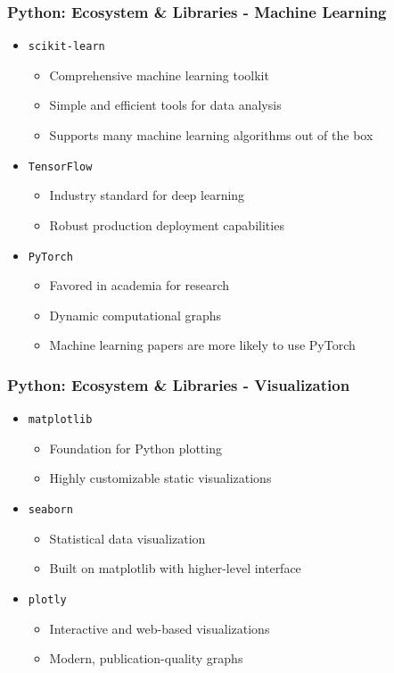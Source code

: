 \documentclass[10pt]{beamer}
\begin{document}
\begin{frame}
    \frametitle{Python: Ecosystem \& Libraries - Machine Learning}
    \begin{itemize}
        \item \texttt{scikit-learn}
            \begin{itemize}
                \item Comprehensive machine learning toolkit
                \item Simple and efficient tools for data analysis
                \item Supports many machine learning algorithms out of the box
            \end{itemize}
        \item \texttt{TensorFlow}
            \begin{itemize}
                \item Industry standard for deep learning
                \item Robust production deployment capabilities
            \end{itemize}
        \item \texttt{PyTorch}
            \begin{itemize}
                \item Favored in academia for research
                \item Dynamic computational graphs
                \item Machine learning papers are more likely to use PyTorch
            \end{itemize}
    \end{itemize}
\end{frame}

\begin{frame}
    \frametitle{Python: Ecosystem \& Libraries - Visualization}
    \begin{itemize}
        \item \texttt{matplotlib}
            \begin{itemize}
                \item Foundation for Python plotting
                \item Highly customizable static visualizations
            \end{itemize}
        \item \texttt{seaborn}
            \begin{itemize}
                \item Statistical data visualization
                \item Built on matplotlib with higher-level interface
            \end{itemize}
        \item \texttt{plotly}
            \begin{itemize}
                \item Interactive and web-based visualizations
                \item Modern, publication-quality graphs
            \end{itemize}
    \end{itemize}
\end{frame}
\end{document}
